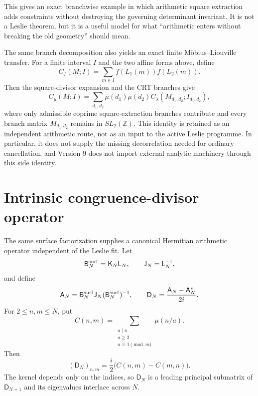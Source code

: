 \documentclass[11pt]{amsart}
\numberwithin{equation}{section}
\theoremstyle{plain}
\theoremstyle{definition}
\theoremstyle{remark}
\begin{document}
This gives an exact branchwise example in which arithmetic square extraction adds constraints
without destroying the governing determinant invariant.  It is not a Leslie theorem, but it is a
useful model for what ``arithmetic enters without breaking the old geometry'' should mean.

The same branch decomposition also yields an exact finite M\"obius--Liouville transfer.  For a
finite interval $I$ and the two affine forms above, define
\[
C_f(M;I)=\sum_{m\in I}f(L_1(m))f(L_2(m)).
\]
Then the square-divisor expansion and the CRT branches give
\begin{equation}
C_\mu(M;I)
=
\sum_{d_1,d_2}
\mu(d_1)\mu(d_2)
C_\lambda(M_{d_1,d_2};I_{d_1,d_2}),
\label{eq:v9_exact_mu_lambda_branch_transfer}
\end{equation}
where only admissible coprime square-extraction branches contribute and every branch matrix
$M_{d_1,d_2}$ remains in $SL_2(\mathbb Z)$.  This identity is retained as an independent
arithmetic route, not as an input to the active Leslie programme.  In particular, it does not
supply the missing decorrelation needed for ordinary cancellation, and Version 9 does not import
external analytic machinery through this side identity.

\section{Intrinsic congruence-divisor operator}
\label{sec:v9_intrinsic_operator_import}

The same surface factorization supplies a canonical Hermitian arithmetic operator independent of
the Leslie fit.  Let
\[
\mathsf B_N^{\rm surf}=\mathsf K_N\mathsf L_N,
\qquad
\mathsf J_N=\mathsf L_N^{-1},
\]
and define
\begin{equation}
\mathsf A_N
=
\mathsf B_N^{\rm surf}\mathsf J_N
(\mathsf B_N^{\rm surf})^{-1},
\qquad
\mathsf D_N
=
\frac{\mathsf A_N-\mathsf A_N^*}{2i}.
\label{eq:v9_intrinsic_D}
\end{equation}
For $2\le n,m\le N$, put
\begin{equation}
C(n,m)
=
\sum_{\substack{a\mid n\\a\ge2\\a\equiv1\pmod m}}
\mu(n/a).
\label{eq:v9_congruence_divisor_C}
\end{equation}
Then
\begin{equation}
\boxed{
(\mathsf D_N)_{n,m}
=
\frac{i}{2}\bigl(C(n,m)-C(m,n)\bigr).
}
\label{eq:v9_intrinsic_D_kernel}
\end{equation}
The kernel depends only on the indices, so $\mathsf D_N$ is a leading principal submatrix of
$\mathsf D_{N+1}$ and its eigenvalues interlace across $N$.
\end{document}
